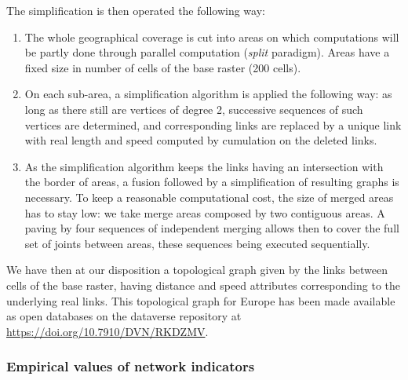 \documentclass[11pt]{article}
\begin{document}
The simplification is then operated the following way:
\begin{enumerate}
\item The whole geographical coverage is cut into areas on which computations will be partly done through parallel computation (\emph{split} paradigm). Areas have a fixed size in number of cells of the base raster (200 cells).
\item On each sub-area, a simplification algorithm is applied the following way: as long as there still are vertices of degree 2, successive sequences of such vertices are determined, and corresponding links are replaced by a unique link with real length and speed computed by cumulation on the deleted links.
\item As the simplification algorithm keeps the links having an intersection with the border of areas, a fusion followed by a simplification of resulting graphs is necessary. To keep a reasonable computational cost, the size of merged areas has to stay low: we take merge areas composed by two contiguous areas. A paving by four sequences of independent merging allows then to cover the full set of joints between areas, these sequences being executed sequentially.
\end{enumerate}



We have then at our disposition a topological graph given by the links between cells of the base raster, having distance and speed attributes corresponding to the underlying real links. This topological graph for Europe has been made available as open databases on the dataverse repository at \url{https://doi.org/10.7910/DVN/RKDZMV}.





\subsubsection{Empirical values of network indicators}
\end{document}
